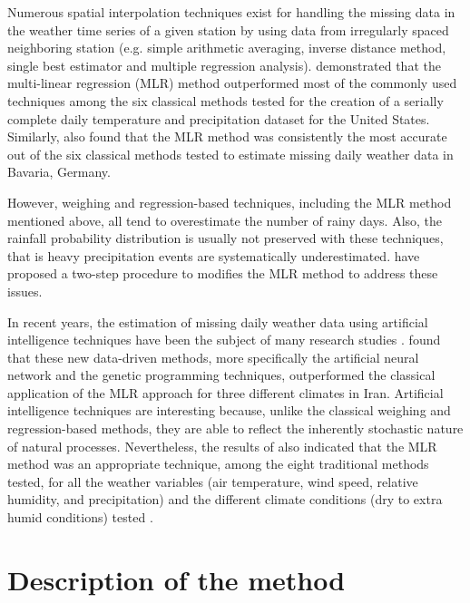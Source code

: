 \documentclass[WHATMANUAL.tex]{subfiles}
\begin{document}
Numerous spatial interpolation techniques exist for handling the missing data in the weather time series of a given station by using data from irregularly spaced neighboring station (e.g. simple arithmetic averaging, inverse distance method, single best estimator and multiple regression analysis). \cite{eischeid_creating_2000} demonstrated that the multi-linear regression (MLR) method \citep{degaetano_method_1995} outperformed most of the commonly used techniques among the six classical methods tested for the creation of a serially complete daily temperature and precipitation dataset for the United States. Similarly, \cite{xia_forest_1999} also found that the MLR method was consistently the most accurate out of the six classical methods tested to estimate missing daily weather data in Bavaria, Germany.

However, weighing and regression-based techniques, including the MLR method mentioned above, all tend to overestimate the number of rainy days. Also, the rainfall probability distribution is usually not preserved with these techniques, that is heavy precipitation events are systematically underestimated. \cite{simolo_improving_2010} have proposed a two-step procedure to modifies the MLR method to address these issues.

In recent years, the estimation of missing daily weather data using artificial intelligence techniques have been the subject of many research studies \cite{kashani_evaluation_2011,kim_spatial_2008,srikanthan_comparison_2005,coulibaly_comparison_2007,abebe_application_2000,teegavarapu_improved_2005}. \cite{kashani_evaluation_2011} found that these new data-driven methods, more specifically the artificial neural network and the genetic programming techniques, outperformed the classical application of the MLR approach for three different climates in Iran. Artificial intelligence techniques are interesting because, unlike the classical weighing and regression-based methods, they are able to reflect the inherently stochastic nature of natural processes. Nevertheless, the results of \cite{kashani_evaluation_2011} also indicated that the MLR method was an appropriate technique, among the eight traditional methods tested, for all the weather variables (air temperature, wind speed, relative humidity, and precipitation) and the different climate conditions (dry to extra humid conditions) tested \citep{kashani_evaluation_2011}.

\section{Description of the method}
\end{document}
